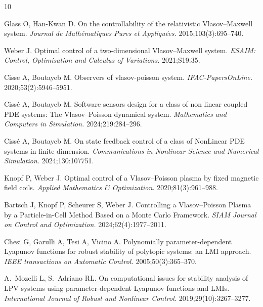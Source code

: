 \documentclass[AMA,Times2COL]{WileyNJDv5}
\begin{document}
%
\begin{thebibliography}{10}
\providecommand \doibase [0]{http://dx.doi.org/}%

Glass O, Han-Kwan D. On the controllability of the relativistic Vlasov--Maxwell
  system. {\it Journal de Math{\'e}matiques Pures et Appliqu{\'e}es.}
  2015\string;103(3)\string:695--740.

Weber J. Optimal control of a two-dimensional Vlasov--Maxwell system. {\it
  ESAIM: Control, Optimisation and Calculus of Variations.}
  2021\string;S19\string:35.

Cisse A, Boutayeb M. Observers of vlasov-poisson system. {\it
  IFAC-PapersOnLine.} 2020\string;53(2)\string:5946--5951.

Ciss{\'e} A, Boutayeb M. Software sensors design for a class of non linear
  coupled PDE systems: The Vlasov--Poisson dynamical system. {\it Mathematics
  and Computers in Simulation.} 2024\string;219\string:284--296.

Ciss{\'e} A, Boutayeb M. On state feedback control of a class of NonLinear PDE
  systems in finite dimension. {\it Communications in Nonlinear Science and
  Numerical Simulation.} 2024\string;130\string:107751.

Knopf P, Weber J. Optimal control of a Vlasov--Poisson plasma by fixed magnetic
  field coils. {\it Applied Mathematics \& Optimization.}
  2020\string;81(3)\string:961--988.

Bartsch J, Knopf P, Scheurer S, Weber J. Controlling a Vlasov--Poisson Plasma
  by a Particle-in-Cell Method Based on a Monte Carlo Framework. {\it SIAM
  Journal on Control and Optimization.} 2024\string;62(4)\string:1977--2011.

Chesi G, Garulli A, Tesi A, Vicino A. Polynomially parameter-dependent Lyapunov
  functions for robust stability of polytopic systems: an LMI approach. {\it
  IEEE transactions on Automatic Control.} 2005\string;50(3)\string:365--370.

A.~Mozelli L, S.~Adriano RL. On computational issues for stability analysis of
  LPV systems using parameter-dependent Lyapunov functions and LMIs. {\it
  International Journal of Robust and Nonlinear Control.}
  2019\string;29(10)\string:3267--3277.


\end{thebibliography}
\end{document}
